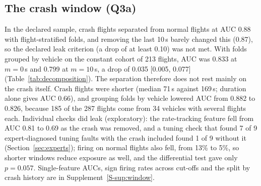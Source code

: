 \documentclass[preprint,12pt]{elsarticle}
\begin{document}
\subsection{The crash window (Q3a)}
\label{sec:window}
\label{sec:confounding}
In the declared sample, crash flights separated from normal flights at AUC 0.88 with flight-stratified folds, and removing the last 10\,s barely changed this (0.87), so the declared leak criterion (a drop of at least 0.10) was not met. With folds grouped by vehicle on the constant cohort of 213 flights, AUC was 0.833 at $m=0$\,s and 0.799 at $m=10$\,s, a drop of 0.035 [0.005, 0.077] (Table~\ref{tab:decomposition}). The separation therefore does not rest mainly on the crash itself. Crash flights were shorter (median 71\,s against 169\,s; duration alone gives AUC 0.66), and grouping folds by vehicle lowered AUC from 0.882 to 0.826, because 185 of the 287 flights come from 34 vehicles with several flights each. Individual checks did leak (exploratory): the rate-tracking feature fell from AUC 0.81 to 0.69 as the crash was removed, and a tuning check that found 7 of 9 expert-diagnosed tuning faults with the crash included found 1 of 9 without it (Section~\ref{sec:experts}); firing on normal flights also fell, from 13\% to 5\%, so shorter windows reduce exposure as well, and the differential test gave only $p=0.057$. Single-feature AUCs, sign firing rates across cut-offs and the split by crash history are in Supplement~\ref{S-sup:window}.
\end{document}
